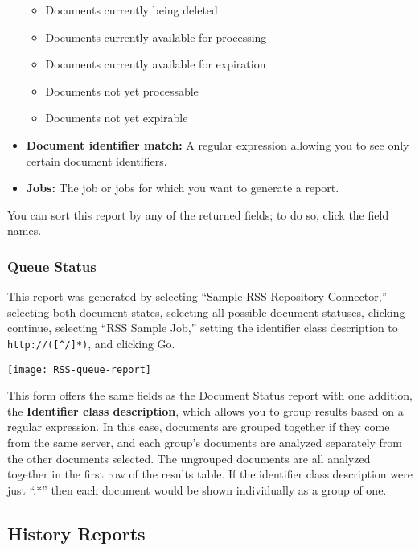 \begin{changemargin}{1.5in}{0in}
\begin{itemize}
\begin{itemize}
\item Documents currently being deleted

\item Documents currently available for processing

\item Documents currently available for expiration

\item Documents not yet processable

\item Documents not yet expirable

\end{itemize}

\item \textbf{Document identifier match:} A regular expression allowing
you to see only certain document identifiers.

\item \textbf{Jobs:} The job or jobs for which you want to generate
a report.

\end{itemize}

You can sort this report by any of the returned fields; to do so,
click the field names.

\subsubsection{Queue Status}

This report was generated by selecting ``Sample RSS Repository
Connector,'' selecting both document states, selecting all possible
document statuses, clicking continue, selecting ``RSS Sample Job,''
setting the identifier class description to \texttt{http://([\^{}/]*)}, and
clicking Go.

\texttt{[image: RSS-queue-report]}

This form offers the same fields as the Document Status report with
one addition, the \textbf{Identifier class description}, which allows
you to group results based on a regular expression. In this case,
documents are grouped together if they come from the same server, and
each group's documents are analyzed separately from the other
documents selected. The ungrouped documents are all analyzed together
in the first row of the results table. If the identifier class
description were just ``.*'' then each document would be shown
individually as a group of one.



\subsection{History Reports}


\end{changemargin}
